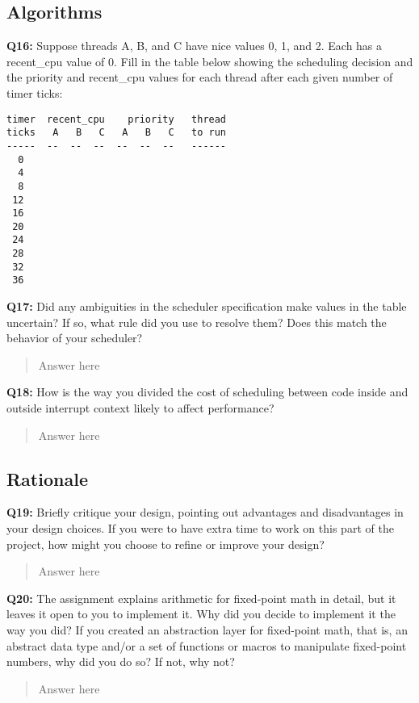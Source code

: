 \documentclass[a4paper,11pt]{paper}
\begin{document}
\subsection{Algorithms}

\textbf{Q16:} Suppose threads A, B, and C have nice values 0, 1, and 2.  Each has a recent\_cpu value of 0.  Fill in the table below showing the scheduling decision and the priority and recent\_cpu values for each thread after each given number of timer ticks:

\small
\begin{Verbatim}[frame=single]
timer  recent_cpu    priority   thread
ticks   A   B   C   A   B   C   to run
-----  --  --  --  --  --  --   ------
  0
  4
  8
 12
 16
 20
 24
 28
 32
 36
\end{Verbatim}


\textbf{Q17:} Did any ambiguities in the scheduler specification make values in the table uncertain?  If so, what rule did you use to resolve them?  Does this match the behavior of your scheduler?
\begin{quote}
  Answer here
\end{quote}


\textbf{Q18:} How is the way you divided the cost of scheduling between code inside and outside interrupt context likely to affect performance?
\begin{quote}
  Answer here
\end{quote}

\subsection{Rationale}

\textbf{Q19:} Briefly critique your design, pointing out advantages and disadvantages in your design choices.  If you were to have extra time to work on this part of the project, how might you choose to refine or improve your design?
\begin{quote}
  Answer here
\end{quote}

\textbf{Q20:} The assignment explains arithmetic for fixed-point math in detail, but it leaves it open to you to implement it.  Why did you decide to implement it the way you did?  If you created an abstraction layer for fixed-point math, that is, an abstract data type and/or a set of functions or macros to manipulate fixed-point numbers, why did you do so?  If not, why not?
\begin{quote}
  Answer here
\end{quote}
\end{document}
